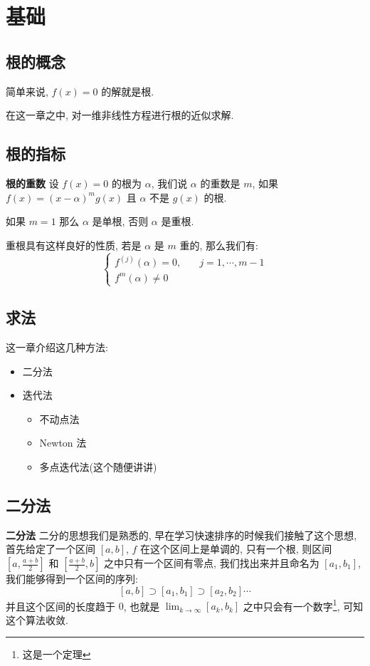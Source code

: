 \section{基础}
\subsection{根的概念}

\begin{frame}
		简单来说, \(f(x) = 0\) 的解就是根.

		在这一章之中, 对一维非线性方程进行根的近似求解.
\end{frame}

\subsection{根的指标}
\begin{frame}
		\noindent \textbf{根的重数} \quad 设 \( f (x) = 0\) 的根为 \(\alpha\), 我们说 \(\alpha\) 的重数是 \(m\),
		如果 \(f (x) = (x -\alpha ) ^{m} g (x)\) 且 \(\alpha\) 不是 \( g(x)\) 的根. 

		如果 \(m = 1\) 那么 \(\alpha\) 是单根, 否则 \(\alpha\) 是重根.

		重根具有这样良好的性质, 若是 \( \alpha\) 是 \(m\) 重的, 那么我们有:
		\[
		\begin{cases}
				f^{(j)} (\alpha) = 0, & \quad j = 1 ,\cdots , m  -  1 \\
				f^{m} (\alpha) \ne 0
		\end{cases}
		\]
\end{frame}

\subsection{求法}
\begin{frame}
		这一章介绍这几种方法:
		\begin{itemize}
			\item 二分法
			\item 迭代法 
			\begin{itemize}
				\item 不动点法
				\item Newton 法
				\item 多点迭代法(这个随便讲讲)
			\end{itemize}
		\end{itemize}
\end{frame}

\subsection{二分法}
\begin{frame}
		\textbf{二分法} \quad 二分的思想我们是熟悉的, 早在学习快速排序的时候我们接触了这个思想, 首先给定了一个区间 \([a , b]\), \(f\) 在这个区间上是单调的, 只有一个根, 则区间 \( [a , \frac{ a + b } 2]\) 和 \([ \frac{a + b } 2, b]\) 之中只有一个区间有零点, 我们找出来并且命名为 \( [a_{1} , b_{1} ]\), 我们能够得到一个区间的序列:
		\[
				[a , b] \supset [a_{1}, b_{1}] \supset [a _{2} , b_{2} ] \cdots 
		\]
		并且这个区间的长度趋于 \(0\), 也就是 \( \lim _{k \to \infty} [ a_{k} , b_{k}]\) 之中只会有一个数字\footnote{这是一个定理}, 可知这个算法收敛.
\end{frame}
